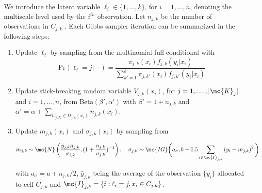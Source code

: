 
We introduce the latent variable $\ell_i \in \{1,\ldots,k\}$, for $i=1,\ldots,n$, denoting the multiscale level used by the $i^{th}$ observation.  
Let $n_{j,k}$ be  the number of observations in $C_{j,k}$ . Each Gibbs sampler iteration can be summarized in the following steps:

\begin{enumerate}
\item Update $\ell_i$ by sampling from the multinomial full conditional with 
\[\mbox{Pr}( \ell_i = j\, |\, \cdot) = \frac{ \pi_{j,k}(x_i)f_{j,k}(y_i|x_i) }{ \sum_{k'=1}^k \pi_{j,k'}(x_i)f_{j,k'}(y_i | x_i) } \label{eq:prS}\]

\item Update stick-breaking random variable $V_{j,k}(x_i)$, for $j=1, \ldots, |\mc{K}_j|$ and $i=1, \ldots, n$, from $\mbox{Beta}(\beta',\alpha')$ with $\beta'=1+n_{j,k}$ and $\alpha'=\alpha+\sum_{C_{j,K} \in D_{j,k}(x_i)} n_{j,k}(x_i)$.

\item Update $m_{j,k}(x_i)$ and $\sigma_{j,k}(x_i)$ by sampling from

\begin{align*}
	m_{j,k} \sim \mc{N}\left(\frac{\bar{y}_{j,k} n_{j,k}}{ \sigma_{j,k}} , (1+\frac{n_{j,k}}{\sigma_{j,k}})^{-1}\right), \quad
	 \sigma_{j,k} \sim \mc{IG}\bigg(a_{\sigma},b+0.5\sum_{i \in \mc{I}_{j,k}} \left(y_{i}-m_{j,k}\right)^2\bigg)	
\end{align*}

with $a_{\sigma}=a+n_{j,k}/2$, $\bar{y}_{j,k}$ being the average of the observation $\{y_i\}$ allocated to cell $C_{j,k}$ and $\mc{I}_{j,k}=\{i : \ell_i=j, x_i \in C_{j,k}\}$.

\end{enumerate}



